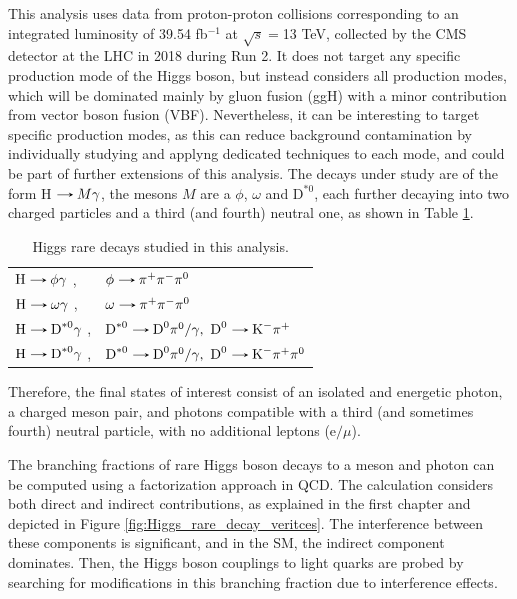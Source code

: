 This analysis uses data from proton-proton collisions corresponding to an integrated luminosity of 39.54 fb$^{-1}$ at $\sqrt{s}=$13 TeV, collected by the CMS detector at the LHC in 2018 during Run 2. It does not target any specific production mode of the Higgs boson, but instead considers all production modes, which will be dominated mainly by gluon fusion (ggH) with a minor contribution from vector boson fusion (VBF). Nevertheless, it can be interesting to target specific production modes, as this can reduce background contamination by individually studying and applyng dedicated techniques to each mode, and could be part of further extensions of this analysis. The decays under study are of the form H$\decaysto M\gamma$, the mesons $M$ are a $\phi$, $\omega$ and $\text{D}^{*0}$, each further decaying into two charged particles and a third (and fourth) neutral one, as shown in Table \ref{tab:Higgs_rare_decays_three}.
\begin{table}[ht]
    \centering
    \begin{tabular}{ll}
        $\text{H}\decaysto \phi\gamma$ ,& $\phi\decaysto \pi^+\pi^-\pi^0$ \\
        $\text{H}\decaysto \omega\gamma$ ,& $\omega\decaysto \pi^+\pi^-\pi^0$\\
        $\text{H}\decaysto \text{D}^{*0}\gamma$ ,& $\text{D}^{*0}\decaysto \text{D}^{0}\pi^{0}/\gamma,\ \text{D}^{0}\decaysto \text{K}^{-}\pi^{+}$\\
        $\text{H}\decaysto \text{D}^{*0}\gamma$ ,& $\text{D}^{*0}\decaysto \text{D}^{0}\pi^{0}/\gamma,\ \text{D}^{0}\decaysto \text{K}^{-}\pi^{+}\pi^{0}$
    \end{tabular}
    \caption{Higgs rare decays studied in this analysis.}
    \label{tab:Higgs_rare_decays_three}
\end{table}

Therefore, the final states of interest consist of an isolated and energetic photon, a charged meson pair, and photons compatible with a third (and sometimes fourth) neutral particle, with no additional leptons (e$/\mu$). 

The branching fractions of rare Higgs boson decays to a meson and photon can be computed using a factorization approach in QCD. The calculation considers both direct and indirect contributions, as explained in the first chapter and depicted in Figure \ref{fig:Higgs_rare_decay_veritces}. The interference between these components is significant, and in the SM, the indirect component dominates. Then, the Higgs boson couplings to light quarks are probed by searching for modifications in this branching fraction due to interference effects.

